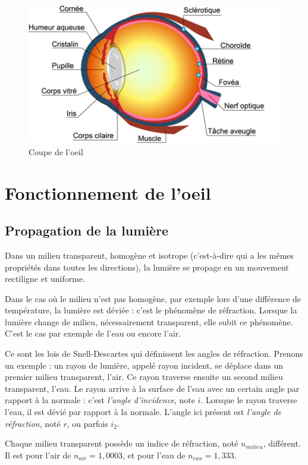 \documentclass[a4paper, 12pt, onecolumn, openany]{report}
\begin{document}
	\begin{figure}[h]
	\begin{center}
	\includegraphics[scale=0.8]{schema_oeil.jpg}
	\end{center}
	\caption{Coupe de l'oeil}
	\label{Coupe de l'oeil}
	\end{figure}
\newpage
	\section{Fonctionnement de l'oeil}
		\subsection{Propagation de la lumière}
		Dans un milieu transparent, homogène et isotrope (c’est-à-dire qui a les mêmes propriétés dans toutes les directions), la lumière se propage en un mouvement rectiligne et uniforme.
		
	Dans le cas où le milieu n’est pas homogène, par exemple lors d’une différence de température, la lumière est déviée : c'est le phénomène de réfraction. Lorsque la lumière change de milieu, nécessairement transparent, elle subit ce phénomène. C’est le cas par exemple de l’eau ou encore l'air. 
	
	Ce sont les lois de Snell-Descartes qui définissent les angles de réfraction. Prenons un exemple : un rayon de lumière, appelé rayon incident, se déplace dans un premier milieu transparent, l'air. Ce rayon traverse ensuite un second milieu transparent, l'eau. Le rayon arrive à la surface de l'eau avec un certain angle par rapport à la normale : c'est \textit{l'angle d'incidence}, note $i$. Lorsque le rayon traverse l'eau, il est dévié par rapport à la normale. L'angle ici présent est \textit{l'angle de réfraction}, noté $r$, ou parfois $i_{2}$.
	
	Chaque milieu transparent possède un indice de réfraction, noté $n_{milieu}$, différent. Il est pour l'air de $n_{air} = 1,0003$, et pour l'eau de $n_{eau} = 1,333$.
	
\end{document}
